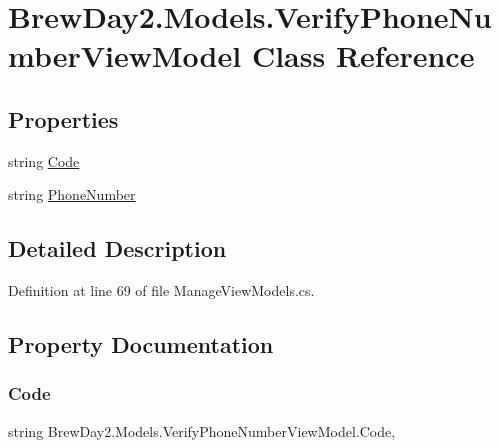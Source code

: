 \hypertarget{class_brew_day2_1_1_models_1_1_verify_phone_number_view_model}{}\section{Brew\+Day2.\+Models.\+Verify\+Phone\+Number\+View\+Model Class Reference}
\label{class_brew_day2_1_1_models_1_1_verify_phone_number_view_model}
\subsection*{Properties}
\begin{DoxyCompactItemize}
\item 
string \mbox{\hyperlink{class_brew_day2_1_1_models_1_1_verify_phone_number_view_model_a3a4d69b39bf8c4d55596411ed6df2e3a}{Code}}
\item 
string \mbox{\hyperlink{class_brew_day2_1_1_models_1_1_verify_phone_number_view_model_aab23d14bd66a710641964744c70b4ca3}{Phone\+Number}}
\end{DoxyCompactItemize}


\subsection{Detailed Description}


Definition at line 69 of file Manage\+View\+Models.\+cs.



\subsection{Property Documentation}
\mbox{\label{class_brew_day2_1_1_models_1_1_verify_phone_number_view_model_a3a4d69b39bf8c4d55596411ed6df2e3a}} 
\subsubsection{\texorpdfstring{Code}{Code}}
{\footnotesize\ttfamily string Brew\+Day2.\+Models.\+Verify\+Phone\+Number\+View\+Model.\+Code\hspace{0.3cm}{\ttfamily [get]}, {\ttfamily [set]}}



